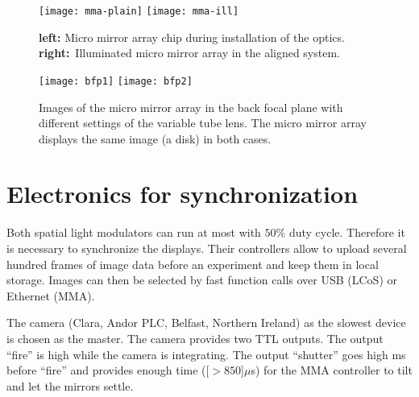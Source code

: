 

\begin{figure}[!hbt]
  \centering
  \texttt{[image: mma-plain]}
  \texttt{[image: mma-ill]}
  \caption{{\bf left:} Micro mirror array chip during installation of
    the optics. {\bf right:}~Illuminated micro mirror array in the
    aligned system.}
  \label{fig:mma-closeup}
\end{figure}

\begin{figure}[!hbt]
  \centering
  \texttt{[image: bfp1]}
  \texttt{[image: bfp2]}
  \caption{Images of the micro mirror array in the back focal plane
    with different settings of the variable tube lens. The micro mirror
    array displays the same image (a disk) in both cases.}
  \label{fig:tubelens-bfp}
\end{figure}

\newpage
\section{Electronics for synchronization}
Both spatial light modulators can run at most with $50\%$ duty
cycle. Therefore it is necessary to synchronize the displays. Their
controllers allow to upload several hundred frames of image data
before an experiment and keep them in local storage. Images can then
be selected by fast function calls over USB (LCoS) or Ethernet (MMA).

The camera (Clara, Andor PLC, Belfast, Northern Ireland) as the
slowest device is chosen as the master. The camera provides two TTL
outputs. The output ``fire'' is high while the camera is
integrating. The output ``shutter'' goes high \unit[1]{ms} before
``fire'' and provides enough time (\unit[$>850$]{$\mu$s}) for the MMA
controller to tilt and let the mirrors settle.

